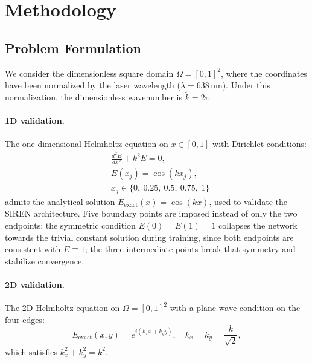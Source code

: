 
\section{Methodology}
\label{sec:methodology}

\subsection{Problem Formulation}
\label{subsec:formulation}

We consider the dimensionless square domain $\Omega = [0,1]^2$, where the
coordinates have been normalized by the laser wavelength
($\lambda = 638\,\mathrm{nm}$).
Under this normalization, the dimensionless wavenumber is $\tilde{k} = 2\pi$.

\paragraph{1D validation.}
The one-dimensional Helmholtz equation on $x \in [0,1]$ with Dirichlet conditions:
%
\begin{equation}
\label{eq:helmholtz1d}
\begin{aligned}
  &\frac{d^2 E}{dx^2} + k^2 E = 0, \\
  &E(x_j) = \cos(k x_j), \\
  &x_j \in \{0,\ 0.25,\ 0.5,\ 0.75,\ 1\}
\end{aligned}
\end{equation}
%
admits the analytical solution $E_{\mathrm{exact}}(x) = \cos(kx)$, used to validate
the SIREN architecture. Five boundary points are imposed instead of only the two
endpoints: the symmetric condition $E(0) = E(1) = 1$ collapses the network towards
the trivial constant solution during training, since both endpoints are consistent
with $E \equiv 1$; the three intermediate points break that symmetry and stabilize
convergence.

\paragraph{2D validation.}
The 2D Helmholtz equation on $\Omega = [0,1]^2$ with a plane-wave condition on the
four edges:
%
\begin{equation}
  E_{\mathrm{exact}}(x,y) = e^{i(k_x x + k_y y)}, \quad k_x = k_y = \frac{k}{\sqrt{2}},
  \label{eq:solution2d}
\end{equation}
%
which satisfies $k_x^2 + k_y^2 = k^2$.


